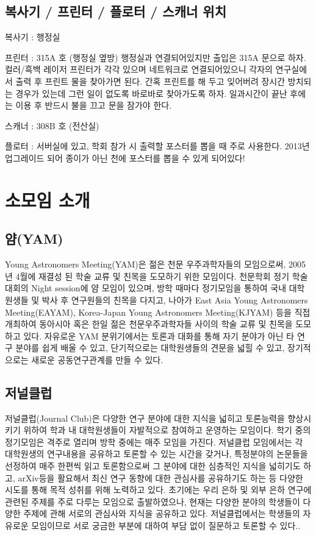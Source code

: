 \subsection{복사기 / 프린터 / 플로터 / 스캐너 위치}
\begin{packed_item}
\item 복사기 : 행정실
\item 프린터 : 315A 호 (행정실 옆방) 행정실과 연결되어있지만 출입은 315A 문으로
  하자. 컬러/흑백 레이저 프린터가 각각 있으며 네트워크로 연결되어있으니 각자의
  연구실에서 출력 후 프린트 물을 찾아가면 된다. 간혹 프린트를 해 두고 잊어버려
  장시간 방치되는 경우가 있는데 그런 일이 없도록 바로바로 찾아가도록
  하자. 일과시간이 끝난 후에는 이용 후 반드시 불을 끄고 문을 잠가야 한다.
\item 스캐너 : 308B 호 (전산실)
\item 플로터 : 서버실에 있고, 학회 참가 시 출력할 포스터를 뽑을 때 주로
  사용한다. 2013년 업그레이드 되어 종이가 아닌 천에 포스터를 뽑을 수 있게
  되어있다!
\end{packed_item}

\section{소모임 소개}
\subsection{얌(YAM)}
Young Astronomers Meeting(YAM)은 젊은 천문 우주과학자들의 모임으로써, 2005년
4월에 재결성 된 학술 교류 및 친목을 도모하기 위한 모임이다. 천문학회 정기
학술대회의 Night session에 얌 모임이 있으며, 방학 때마다 정기모임을 통하여 국내
대학원생들 및 박사 후 연구원들의 친목을 다지고, 나아가 East Asia Young
Astronomers Meeting(EAYAM), Korea-Japan Young Astronomers Meeting(KJYAM) 등을
직접 개최하여 동아시아 혹은 한일 젊은 천문우주과학자들 사이의 학술 교류 및 친목을
도모하고 있다. 자유로운 YAM 분위기에서는 토론과 대화를 통해 자기 분야가 아닌 타
연구 분야를 쉽게 배울 수 있고, 단기적으로는 대학원생들의 견문을 넓힐 수 있고,
장기적으로는 새로운 공동연구관계를 만들 수 있다.

\subsection{저널클럽}
저널클럽(Journal Club)은 다양한 연구 분야에 대한 지식을 넓히고 토론능력을
향상시키기 위하여 학과 내 대학원생들이 자발적으로 참여하고 운영하는
모임이다. 학기 중의 정기모임은 격주로 열리며 방학 중에는 매주 모임을
가진다. 저널클럽 모임에서는 각 대학원생의 연구내용을 공유하고 토론할 수 있는
시간을 갖거나, 특정분야의 논문들을 선정하여 매주 한편씩 읽고 토론함으로써 그
분야에 대한 심층적인 지식을 넓히기도 하고, arXiv등을 활요해서 최신 연구 동향에
대한 관심사를 공유하기도 하는 등 다양한 시도를 통해 목적 성취를 위해 노력하고
있다. 초기에는 우리 은하 및 외부 은하 연구에 관련된 주제를 주로 다루는 모임으로
출발하였으나, 현재는 다양한 분야의 학생들이 다양한 주제에 관해 서로의 관심사와
지식을 공유하고 있다. 저널클럽에서는 학생들의 자유로운 모임이므로 서로 궁금한
부분에 대하여 부담 없이 질문하고 토론할 수 있다..

